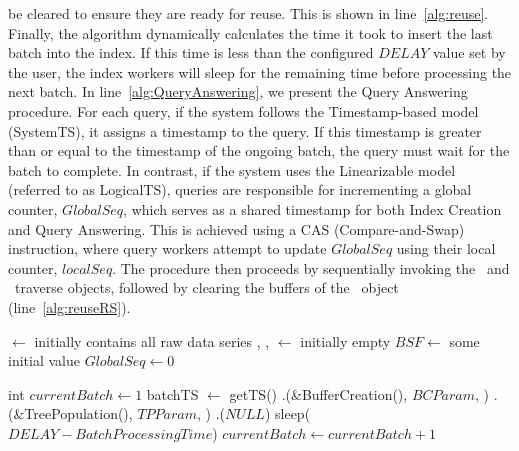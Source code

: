 {be cleared to ensure they are ready for reuse. This is shown in line~\ref{alg:reuse}.
Finally, the algorithm dynamically calculates the time it took to insert the last batch
into the index. If this time is less than the configured $DELAY$ value set by the user,
the index workers will sleep for the remaining time before processing the next batch.
% 
In line~\ref{alg:QueryAnswering}, we present the Query Answering procedure. For each
query, if the system follows the Timestamp-based model (SystemTS), it assigns a
timestamp to the query. If this timestamp is greater than or equal to the timestamp
of the ongoing batch, the query must wait for the batch to complete.
In contrast, if the system uses the Linearizable model (referred to as LogicalTS),
queries are responsible for incrementing a global counter, $GlobalSeq$, which serves
as a shared timestamp for both Index Creation and Query Answering. This is achieved
using a CAS (Compare-and-Swap) instruction, where query workers attempt to update
$GlobalSeq$ using their local counter, $localSeq$. The procedure then proceeds by
sequentially invoking the \PS\ and \RS\ traverse objects, followed by clearing the
buffers of the \RS\ object (line~\ref{alg:reuseRS}).

\begin{algorithm}[htbp]
    \footnotesize
    \vspace*{2mm}
    
    \begin{algorithmic}[1]
    
        \State \BC $\gets$ initially contains all raw data series
        \State \TP, \PS, \RS $\gets$ initially empty
        \State $\mathit{BSF} \gets$ some initial value
        \State $\mathit{GlobalSeq} \gets 0$
    \EndProcedure
    
    \vspace*{1mm}
    \vspace*{1mm}
    
      \label{alg:IndexCreation}
        \State int $\mathit{currentBatch} \gets 1$
                \State batchTS $\gets$ getTS()
            \EndIf
            \State \BC.\Traverse(\&BufferCreation(), $\mathit{BCParam}$, \False)
            \State \TP.\Traverse(\&TreePopulation(), $\mathit{TPParam}$, \False)
            \State \TP.\Clean($\mathit{NULL}$) \label{alg:reuse}
                \State sleep($\mathit{DELAY}-\mathit{BatchProcessingTime}$)
            \EndIf
            \State $\mathit{currentBatch} \gets \mathit{currentBatch} + 1$
        \EndWhile
    \EndProcedure
    

\end{algorithmic}
\end{algorithm}}
